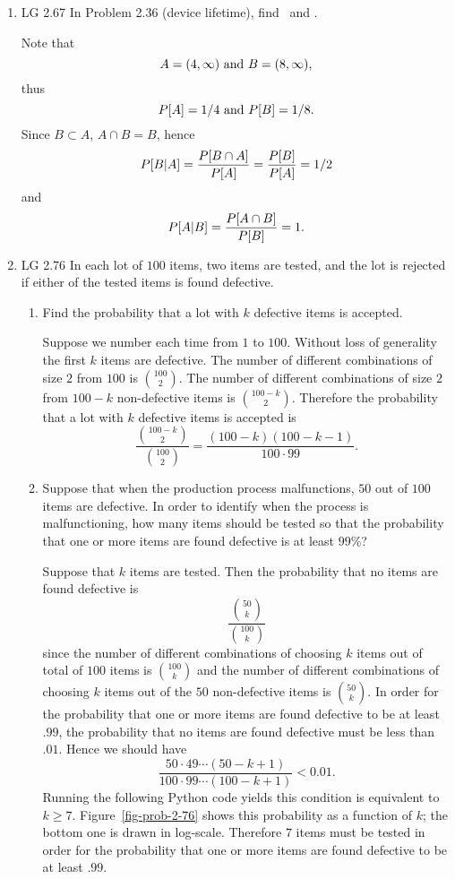 \begin{enumerate}
\begin{solution}
	\end{solution}
	\fi

	\item LG 2.67
	\ifdefined\sol
	In Problem 2.36 (device lifetime), find \ and .
	\begin{solution}
		Note that
		\[ A = (4,\infty) \mbox{ and } B = (8,\infty), \]
		thus
		\[ P[A] = 1/4 \mbox{ and } P[B] = 1/8. \]
		Since $B\subset A$, $A\cap B = B$,
		hence
		\[
			P[B|A] = \frac{P[B\cap A]}{P[A]} = \frac{P[B]}{P[A]} = 1/2
		\]
		and
		\[
			P[A|B] = \frac{P[A\cap B]}{P[B]} = 1.
		\]

	\end{solution}
	\fi


	\item LG 2.76
	\ifdefined\sol
	In each lot of $100$ items,
	two items are tested,
	and the lot is rejected if either of the tested items is found defective.
	\begin{enumerate}
		\item Find the probability that a lot with $k$ defective items
		is accepted.
		\begin{solution}
			Suppose we number each time from $1$ to $100$.
			Without loss of generality the first $k$ items are defective.
			The number of different combinations of size $2$ from $100$ is
			$100 \choose 2$.
			The number of different combinations of size $2$ from $100-k$
			non-defective items is $100-k\choose 2$.
			Therefore the probability that a lot with $k$
			defective items is accepted is
			\[
				\frac{{100-k\choose 2}}{{100\choose2 }}
				= \frac{(100-k)(100-k-1)}{100\cdot 99}.
			\]
		\end{solution}

		\item Suppose that when the production process malfunctions,
		$50$ out of $100$ items are defective.
		In order to identify when the process is malfunctioning,
		how many items should be tested so that the probability
		that one or more items are found defective is at least $99$\%?
		\begin{solution}
			Suppose that $k$ items are tested.
			Then the probability that no items are found defective is
			\[
				\frac{{50 \choose k}}{{100 \choose k}}
			\]
			since the number of different combinations of choosing $k$
			items out of total of $100$ items is $100 \choose k$
			and the number of different combinations of choosing $k$
			items out of the $50$ non-defective items is $50 \choose k$.
			In order for the probability that one or more items are found defective
			to be at least $.99$,
			the probability that no items are found defective must be
			less than $.01$.
			Hence we should have
			\[
				\frac{50\cdot49\cdots (50-k+1)}
				{100\cdot99\cdots (100-k+1)}
				< 0.01.
			\]
			Running the following Python code yields
			this condition is equivalent to $k \geq 7$.
			Figure~\ref{fig-prob-2-76}
			shows this probability as a function of $k$;
			the bottom one is drawn in log-scale.
			Therefore $7$ items must be tested
			in order for the probability that one or more items are found defective
			to be at least $.99$.


\end{solution}
\end{enumerate}
\end{enumerate}
